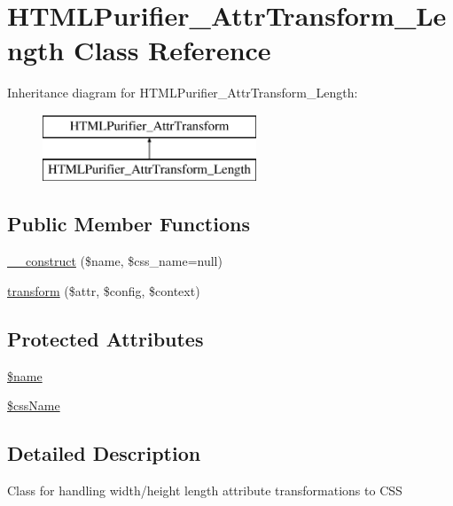 \hypertarget{classHTMLPurifier__AttrTransform__Length}{\section{H\+T\+M\+L\+Purifier\+\_\+\+Attr\+Transform\+\_\+\+Length Class Reference}
\label{classHTMLPurifier__AttrTransform__Length}
}
Inheritance diagram for H\+T\+M\+L\+Purifier\+\_\+\+Attr\+Transform\+\_\+\+Length\+:\begin{figure}[H]
\begin{center}
\leavevmode
\includegraphics[height=2.000000cm]{classHTMLPurifier__AttrTransform__Length}
\end{center}
\end{figure}
\subsection*{Public Member Functions}
\begin{DoxyCompactItemize}
\item 
\hyperlink{classHTMLPurifier__AttrTransform__Length_a7485aa26bf9ec1b57a965f0ff3daf08f}{\+\_\+\+\_\+construct} (\$name, \$css\+\_\+name=null)
\item 
\hyperlink{classHTMLPurifier__AttrTransform__Length_acc1f48d3ccb4120371b4c5132f646174}{transform} (\$attr, \$config, \$context)
\end{DoxyCompactItemize}
\subsection*{Protected Attributes}
\begin{DoxyCompactItemize}
\item 
\hyperlink{classHTMLPurifier__AttrTransform__Length_abd9ec3d6894fadd50a4955376bb409f5}{\$name}
\item 
\hyperlink{classHTMLPurifier__AttrTransform__Length_acf4647e011cfb76591ee8bdbf8827d96}{\$css\+Name}
\end{DoxyCompactItemize}


\subsection{Detailed Description}
Class for handling width/height length attribute transformations to C\+S\+S 


